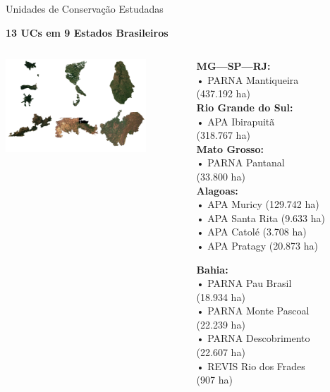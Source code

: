 \documentclass[aspectratio=169,11pt]{beamer}
\begin{document}
\begin{frame}{Unidades de Conservação Estudadas}
\vspace{-0.6cm}
\begin{center}
    \textbf{\large 13 UCs em 9 Estados Brasileiros}
\end{center}

\vspace{-0.6cm}
\begin{columns}[c]
    \begin{column}{0.35\textwidth}
        \includegraphics[width=\textwidth,height=3.5cm,keepaspectratio]{img/mosaic_top1_output-each-area.jpg}
    \end{column}
    \begin{column}{0.63\textwidth}
        \begin{multicols}{2}
        {\scriptsize
        \textbf{MG---SP---RJ:}\\
        • PARNA Mantiqueira\\
        \quad (437.192 ha)\\[3pt]
        
        \textbf{Rio Grande do Sul:}\\
        • APA Ibirapuitã\\
        \quad (318.767 ha)\\[3pt]
        
        \textbf{Mato Grosso:}\\
        • PARNA Pantanal\\
        \quad (33.800 ha)\\[3pt]
        
        \textbf{Alagoas:}\\
        • APA Muricy (129.742 ha)\\
        • APA Santa Rita (9.633 ha)\\
        • APA Catolé (3.708 ha)\\
        • APA Pratagy (20.873 ha)\\[3pt]
        
        \columnbreak%
        
        \textbf{Bahia:}\\
        • PARNA Pau Brasil\\
        \quad (18.934 ha)\\
        • PARNA Monte Pascoal\\
        \quad (22.239 ha)\\
        • PARNA Descobrimento\\
        \quad (22.607 ha)\\
        • REVIS Rio dos Frades\\
        \quad (907 ha)\\[3pt]
        
}
\end{multicols}
\end{column}
\end{columns}
\end{frame}
\end{document}
